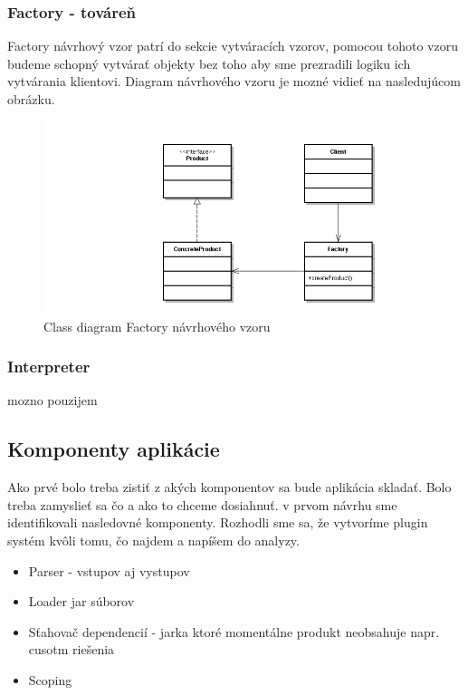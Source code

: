 \subsubsection{Factory - továreň}
\indent Factory návrhový vzor patrí do sekcie vytváracích vzorov, pomocou tohoto vzoru budeme schopný vytvárať objekty bez toho aby sme prezradili logiku ich vytvárania klientovi.
Diagram návrhového vzoru je mozné vidieť na nasledujúcom obrázku.
\begin{figure}[!htbp]
	\centering
	\includegraphics[width=10cm]{img/factory_design_pattern.jpg}
	\caption{Class diagram Factory návrhového vzoru}
	\label{fig:test}
\end{figure}
\newline

\subsubsection{Interpreter}
mozno pouzijem
\subsection{Komponenty aplikácie}
\indent Ako prvé bolo treba zistiť z akých komponentov sa bude aplikácia skladať. Bolo treba zamyslieť sa čo a ako to chceme dosiahnuť. v prvom návrhu sme identifikovali nasledovné komponenty. Rozhodli sme sa, že vytvoríme plugin systém kvôli tomu, čo najdem a napíšem do analyzy.
\begin{itemize}
	\item Parser - vstupov aj vystupov
	\item Loader jar súborov
	\item Sťahovač dependencií - jarka ktoré momentálne produkt neobsahuje napr. cusotm riešenia
	\item Scoping
\end{itemize}

